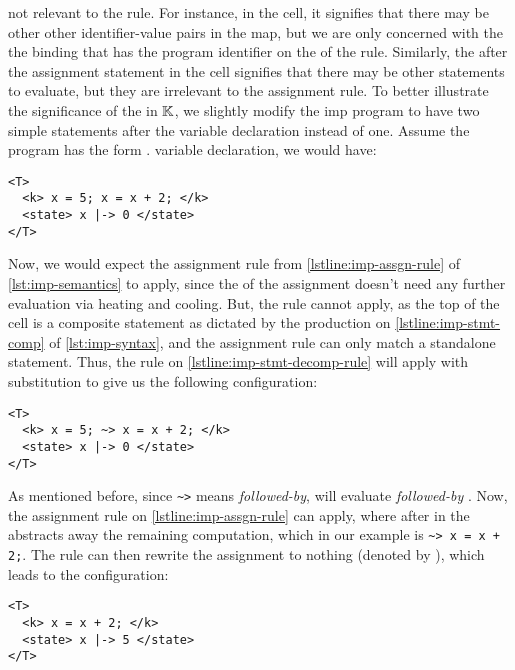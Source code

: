 not relevant to the rule. For instance, in the 
cell, it signifies that there may be other other identifier-value
pairs in the map, but we are only concerned with the
the binding that has the program identifier on the \LHS{} of
the rule. Similarly, the  after the assignment statement
in the  cell signifies that there may be other statements
to evaluate, but they are irrelevant to the assignment rule.
To better illustrate the significance of the  in $\mathbb{K}$,
we slightly modify the imp program to have two simple statements
after the variable declaration instead of one.
Assume the program has the form .
variable declaration, we would have:
\begin{lstlisting}[language=k,style=ksty,frame=single]
<T>
  <k> x = 5; x = x + 2; </k>
  <state> x |-> 0 </state>
</T>
\end{lstlisting}
Now, we would expect the assignment rule from \autoref{lstline:imp-assgn-rule}
of \autoref{lst:imp-semantics} to apply, since the \RHS{} of
the assignment  doesn't need any further
evaluation via heating and cooling.
But, the rule cannot apply, as the top of the  cell
is a composite statement as dictated by the production on
\autoref{lstline:imp-stmt-comp} of \autoref{lst:imp-syntax},
and the assignment rule can
only match a standalone statement. Thus, the rule on
\autoref{lstline:imp-stmt-decomp-rule} will apply with
substitution
to give us the following configuration:
\begin{lstlisting}[language=k,style=ksty,frame=single]
<T>
  <k> x = 5; ~> x = x + 2; </k>
  <state> x |-> 0 </state>
</T>
\end{lstlisting}
As mentioned before, since \lstinline[style=ksty]{~>} means
\emph{followed-by}, \K{} will evaluate 
\emph{followed-by} . Now, the assignment
rule on \autoref{lstline:imp-assgn-rule} can apply,
where  after  in the 
abstracts away the remaining computation, which in our example
is \lstinline[style=ksty]{~> x = x + 2;}. The rule can then
rewrite the assignment  to nothing (denoted by
), which leads to the configuration:
\begin{lstlisting}[language=k,style=ksty,frame=single]
<T>
  <k> x = x + 2; </k>
  <state> x |-> 5 </state>
</T>
\end{lstlisting}


